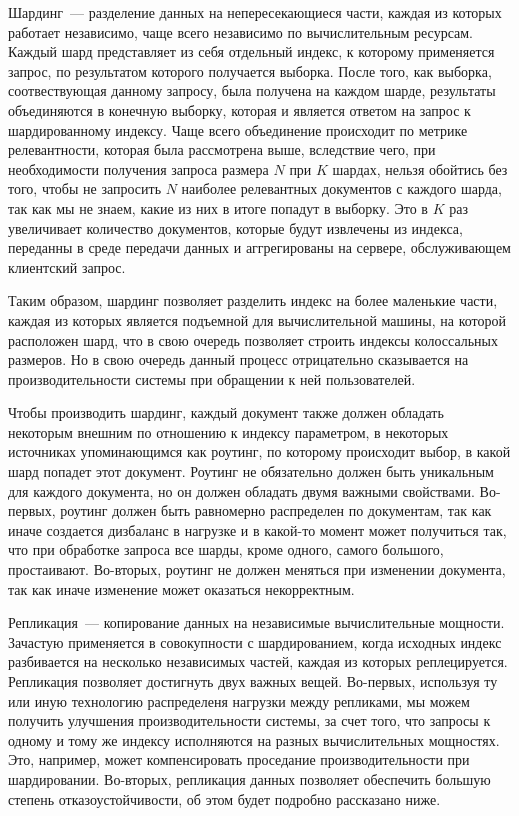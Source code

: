 Шардинг~--- разделение данных на непересекающиеся части, каждая из которых работает независимо, чаще всего независимо по вычислительным ресурсам. Каждый шард представляет из себя отдельный индекс, к которому применяется запрос, по результатом которого получается выборка. После того, как выборка, соотвествующая данному запросу, была получена на каждом шарде, результаты объединяются в конечную выборку, которая и является ответом на запрос к шардированному индексу. Чаще всего объединение происходит по метрике релевантности, которая была рассмотрена выше, вследствие чего, при необходимости получения запроса размера $N$ при $K$ шардах, нельзя обойтись без того, чтобы не запросить $N$ наиболее релевантных документов с каждого шарда, так как мы не знаем, какие из них в итоге попадут в выборку. Это в $K$ раз увеличивает количество документов, которые будут извлечены из индекса, переданны в среде передачи данных и аггрегированы на сервере, обслуживающем клиентский запрос.

Таким образом, шардинг позволяет разделить индекс на более маленькие части, каждая из которых является подъемной для вычислительной машины, на которой расположен шард, что в свою очередь позволяет строить индексы колоссальных размеров. Но в свою очередь данный процесс отрицательно сказывается на производительности системы при обращении к ней пользователей.

Чтобы производить шардинг, каждый документ также должен обладать некоторым внешним по отношению к индексу параметром, в некоторых источниках упоминающимся как роутинг, по которому происходит выбор, в какой шард попадет этот документ. Роутинг не обязательно должен быть уникальным для каждого документа, но он должен обладать двумя важными свойствами. Во-первых, роутинг должен быть равномерно распределен по документам, так как иначе создается дизбаланс в нагрузке и в какой-то момент может получиться так, что при обработке запроса все шарды, кроме одного, самого большого, простаивают. Во-вторых, роутинг не должен меняться при изменении документа, так как иначе изменение может оказаться некорректным.

Репликация~--- копирование данных на независимые вычислительные мощности. Зачастую применяется в совокупности с шардированием, когда исходных индекс разбивается на несколько независимых частей, каждая из которых реплецируется. Репликация позволяет достигнуть двух важных вещей. Во-первых, используя ту или иную технологию распределеня нагрузки между репликами, мы можем получить улучшения производительности системы, за счет того, что запросы к одному и тому же индексу исполняются на разных вычислительных мощностях. Это, например, может компенсировать проседание производительности при шардировании. Во-вторых, репликация данных позволяет обеспечить большую степень отказоустойчивости, об этом будет подробно рассказано ниже.


